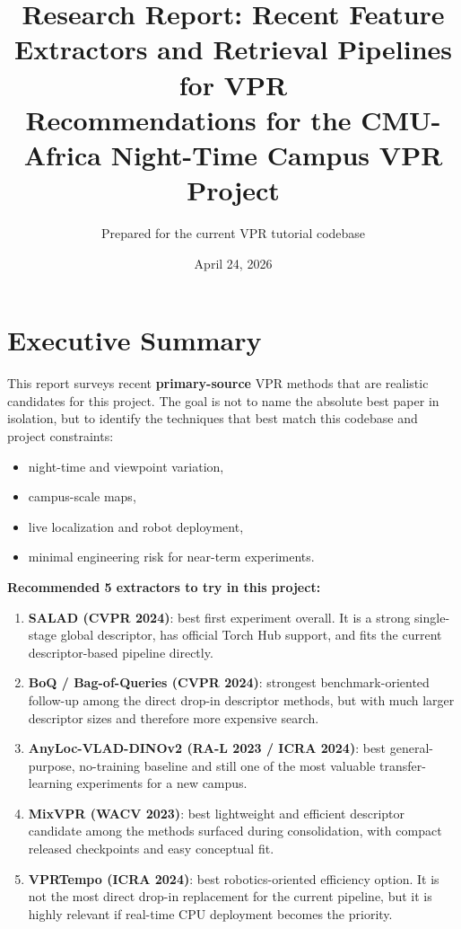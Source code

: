 \documentclass[11pt]{article}
\title{\textbf{Research Report: Recent Feature Extractors and Retrieval Pipelines for VPR}\\[4pt]
Recommendations for the CMU-Africa Night-Time Campus VPR Project}
\author{Prepared for the current VPR tutorial codebase}
\date{April 24, 2026}
\begin{document}
\maketitle

\section*{Executive Summary}
This report surveys recent \textbf{primary-source} VPR methods that are realistic candidates for this project. The goal is not to name the absolute best paper in isolation, but to identify the techniques that best match this codebase and project constraints:
\begin{itemize}[leftmargin=*]
  \item night-time and viewpoint variation,
  \item campus-scale maps,
  \item live localization and robot deployment,
  \item minimal engineering risk for near-term experiments.
\end{itemize}

\textbf{Recommended 5 extractors to try in this project:}
\begin{enumerate}[leftmargin=*]
  \item \textbf{SALAD (CVPR 2024)}: best first experiment overall. It is a strong single-stage global descriptor, has official Torch Hub support, and fits the current descriptor-based pipeline directly.
  \item \textbf{BoQ / Bag-of-Queries (CVPR 2024)}: strongest benchmark-oriented follow-up among the direct drop-in descriptor methods, but with much larger descriptor sizes and therefore more expensive search.
  \item \textbf{AnyLoc-VLAD-DINOv2 (RA-L 2023 / ICRA 2024)}: best general-purpose, no-training baseline and still one of the most valuable transfer-learning experiments for a new campus.
  \item \textbf{MixVPR (WACV 2023)}: best lightweight and efficient descriptor candidate among the methods surfaced during consolidation, with compact released checkpoints and easy conceptual fit.
  \item \textbf{VPRTempo (ICRA 2024)}: best robotics-oriented efficiency option. It is not the most direct drop-in replacement for the current pipeline, but it is highly relevant if real-time CPU deployment becomes the priority.
\end{enumerate}
\end{document}
